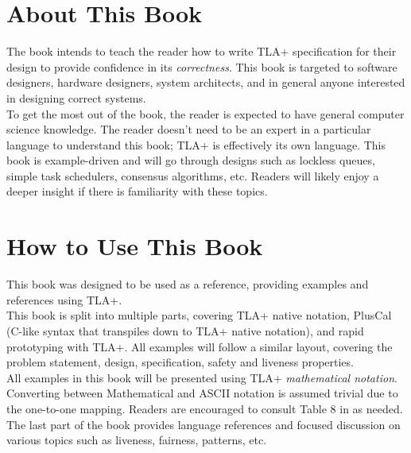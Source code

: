 \section{About This Book}

The book intends to teach the reader how to write TLA+ specification for their
design to provide confidence in its \textit{correctness}. This book is targeted
to software designers, hardware designers, system architects, and in general
anyone interested in designing correct systems.\\

To get the most out of the book, the reader is expected to have general computer
science knowledge. The reader doesn't need to be an expert in a particular
language to understand this book; TLA+ is effectively its own language. This
book is example-driven and will go through designs such as lockless queues,
simple task schedulers, consensus algorithms, etc. Readers will likely enjoy a
deeper insight if there is familiarity with these topics.

\section{How to Use This Book}

This book was designed to be used as a reference, providing examples and
references using TLA+.\\

This book is split into multiple parts, covering TLA+ native notation, PlusCal
(C-like syntax that transpiles down to TLA+ native notation), and rapid
prototyping with TLA+. All examples will follow a similar layout, covering the
problem statement, design, specification, safety and liveness properties.\\

All examples in this book will be presented using TLA+ \textit{mathematical
notation}. Converting between Mathematical and ASCII notation is assumed trivial
due to the one-to-one mapping. Readers are encouraged to consult Table 8 in
\cite{ss} as needed.\\

The last part of the book provides language references and focused discussion on
various topics such as liveness, fairness, patterns, etc.
